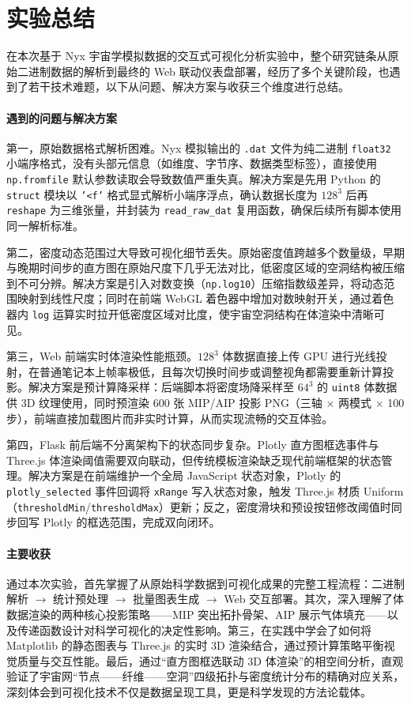 \documentclass[12pt,a4paper]{article}
\begin{document}
\section{实验总结}

在本次基于 Nyx 宇宙学模拟数据的交互式可视化分析实验中，整个研究链条从原始二进制数据的解析到最终的 Web 联动仪表盘部署，经历了多个关键阶段，也遇到了若干技术难题，以下从问题、解决方案与收获三个维度进行总结。

\paragraph{遇到的问题与解决方案}

第一，原始数据格式解析困难。Nyx 模拟输出的 \texttt{.dat} 文件为纯二进制 \texttt{float32} 小端序格式，没有头部元信息（如维度、字节序、数据类型标签），直接使用 \texttt{np.fromfile} 默认参数读取会导致数值严重失真。解决方案是先用 Python 的 \texttt{struct} 模块以 \texttt{'<f'} 格式显式解析小端序浮点，确认数据长度为 $128^3$ 后再 \texttt{reshape} 为三维张量，并封装为 \texttt{read\_raw\_dat} 复用函数，确保后续所有脚本使用同一解析标准。

第二，密度动态范围过大导致可视化细节丢失。原始密度值跨越多个数量级，早期与晚期时间步的直方图在原始尺度下几乎无法对比，低密度区域的空洞结构被压缩到不可分辨。解决方案是引入对数变换（\texttt{np.log10}）压缩指数级差异，将动态范围映射到线性尺度；同时在前端 WebGL 着色器中增加对数映射开关，通过着色器内 \texttt{log} 运算实时拉开低密度区域对比度，使宇宙空洞结构在体渲染中清晰可见。

第三，Web 前端实时体渲染性能瓶颈。$128^3$ 体数据直接上传 GPU 进行光线投射，在普通笔记本上帧率极低，且每次切换时间步或调整视角都需要重新计算投影。解决方案是预计算降采样：后端脚本将密度场降采样至 $64^3$ 的 \texttt{uint8} 体数据供 3D 纹理使用，同时预渲染 600 张 MIP/AIP 投影 PNG（三轴 × 两模式 × 100 步），前端直接加载图片而非实时计算，从而实现流畅的交互体验。

第四，Flask 前后端不分离架构下的状态同步复杂。Plotly 直方图框选事件与 Three.js 体渲染阈值需要双向联动，但传统模板渲染缺乏现代前端框架的状态管理。解决方案是在前端维护一个全局 JavaScript 状态对象，Plotly 的 \texttt{plotly\_selected} 事件回调将 \texttt{xRange} 写入状态对象，触发 Three.js 材质 Uniform（\texttt{thresholdMin}/\texttt{thresholdMax}）更新；反之，密度滑块和预设按钮修改阈值时同步回写 Plotly 的框选范围，完成双向闭环。

\paragraph{主要收获}

通过本次实验，首先掌握了从原始科学数据到可视化成果的完整工程流程：二进制解析 $\rightarrow$ 统计预处理 $\rightarrow$ 批量图表生成 $\rightarrow$ Web 交互部署。其次，深入理解了体数据渲染的两种核心投影策略——MIP 突出拓扑骨架、AIP 展示气体填充——以及传递函数设计对科学可视化的决定性影响。第三，在实践中学会了如何将 Matplotlib 的静态图表与 Three.js 的实时 3D 渲染结合，通过预计算策略平衡视觉质量与交互性能。最后，通过``直方图框选联动 3D 体渲染''的相空间分析，直观验证了宇宙网``节点——纤维——空洞''四级拓扑与密度统计分布的精确对应关系，深刻体会到可视化技术不仅是数据呈现工具，更是科学发现的方法论载体。
\end{document}
